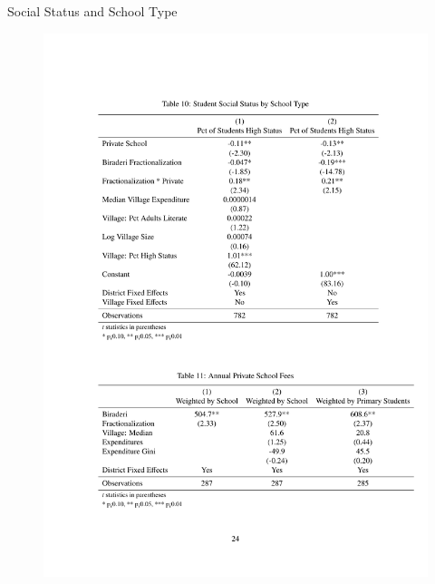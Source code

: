 \documentclass{beamer}
\begin{document}
\begin{frame}{Social Status and School Type}
	\begin{figure}[htb]
		\begin{center}
		\includegraphics[scale=0.5]{tables/social_status_type.pdf}
		\end{center}
	\end{figure}
\end{frame}
\end{document}
